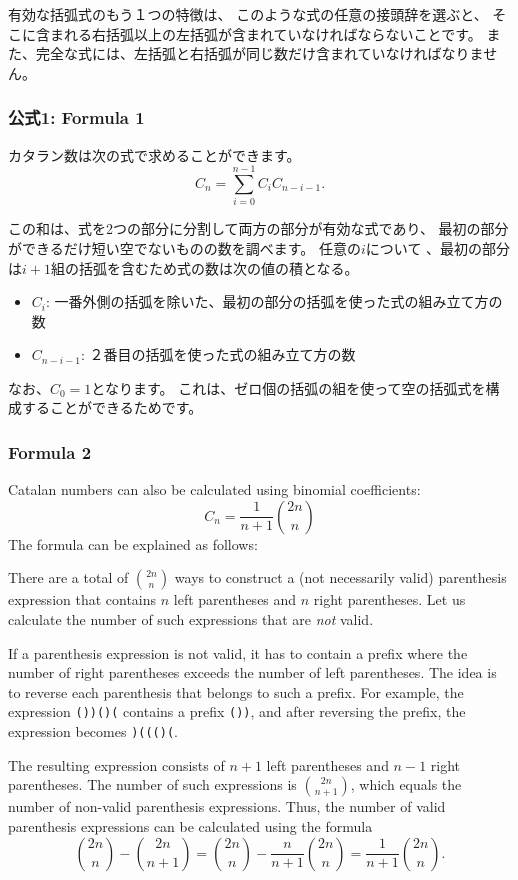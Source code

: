 有効な括弧式のもう１つの特徴は、
このような式の任意の接頭辞を選ぶと、
そこに含まれる右括弧以上の左括弧が含まれていなければならないことです。
また、完全な式には、左括弧と右括弧が同じ数だけ含まれていなければなりません。

\subsubsection{公式1: Formula 1}

カタラン数は次の式で求めることができます。
\[ C_n = \sum_{i=0}^{n-1} C_{i} C_{n-i-1}.\]

この和は、式を2つの部分に分割して両方の部分が有効な式であり、
最初の部分ができるだけ短い空でないものの数を調べます。
任意の$i$について 、最初の部分は$i + 1$組の括弧を含むため式の数は次の値の積となる。

\begin{itemize}
\item $C_{i}$: 一番外側の括弧を除いた、最初の部分の括弧を使った式の組み立て方の数
\item $C_{n-i-1}$: ２番目の括弧を使った式の組み立て方の数
\end{itemize}

なお、$C_0=1$となります。
これは、ゼロ個の括弧の組を使って空の括弧式を構成することができるためです。

\subsubsection{Formula 2}

Catalan numbers can also be calculated
using binomial coefficients:
\[ C_n = \frac{1}{n+1} {2n \choose n}\]
The formula can be explained as follows:

There are a total of ${2n \choose n}$ ways
to construct a (not necessarily valid)
parenthesis expression that contains $n$ left
parentheses and $n$ right parentheses.
Let us calculate the number of such
expressions that are \emph{not} valid.

If a parenthesis expression is not valid,
it has to contain a prefix where the
number of right parentheses exceeds the
number of left parentheses.
The idea is to reverse each parenthesis
that belongs to such a prefix.
For example, the expression
\texttt{())()(} contains a prefix \texttt{())},
and after reversing the prefix,
the expression becomes \texttt{)((()(}.

The resulting expression consists of $n+1$
left parentheses and $n-1$ right parentheses.
The number of such expressions is ${2n \choose n+1}$,
which equals the number of non-valid
parenthesis expressions.
Thus, the number of valid parenthesis
expressions can be calculated using the formula
\[{2n \choose n}-{2n \choose n+1} = {2n \choose n} - \frac{n}{n+1} {2n \choose n} = \frac{1}{n+1} {2n \choose n}.\]

